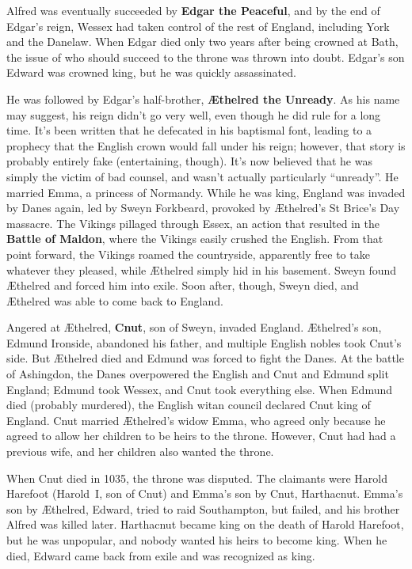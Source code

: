 Alfred was eventually succeeded by \textbf{Edgar the Peaceful}, and by the end of Edgar's reign,
Wessex had taken control of the rest of England, including York and the Danelaw.
When Edgar died only two years after being crowned at Bath,
the issue of who should succeed to the throne was thrown into doubt.
Edgar's son Edward was crowned king, but he was quickly assassinated.

He was followed by Edgar's half-brother, \textbf{\AE{}thelred the Unready}.
As his name may suggest, his reign didn't go very well, even though he did rule for a long time.
It's been written that he defecated in his baptismal font,
leading to a prophecy that the English crown would fall under his reign;
however, that story is probably entirely fake (entertaining, though).
It's now believed that he was simply the victim of bad counsel, and wasn't actually particularly ``unready''.
He married Emma, a princess of Normandy.
While he was king, England was invaded by Danes again, led by Sweyn Forkbeard,
provoked by \AE{}thelred's St Brice's Day massacre.
The Vikings pillaged through Essex, an action that resulted in the \textbf{Battle of Maldon},
where the Vikings easily crushed the English.
From that point forward, the Vikings roamed the countryside,
apparently free to take whatever they pleased,
while \AE{}thelred simply hid in his basement.
Sweyn found \AE{}thelred and forced him into exile.
Soon after, though, Sweyn died, and \AE{}thelred was able to come back to England.

Angered at \AE{}thelred, \textbf{Cnut}, son of Sweyn, invaded England.
\AE{}thelred's son, Edmund Ironside, abandoned his father,
and multiple English nobles took Cnut's side.
But \AE{}thelred died and Edmund was forced to fight the Danes.
At the battle of Ashingdon, the Danes overpowered the English and Cnut and Edmund split England;
Edmund took Wessex, and Cnut took everything else.
When Edmund died (probably murdered), the English witan council declared Cnut king of England.
Cnut married \AE{}thelred's widow Emma,
who agreed only because he agreed to allow her children to be heirs to the throne.
However, Cnut had had a previous wife, and her children also wanted the throne.

When Cnut died in 1035, the throne was disputed.
The claimants were Harold Harefoot (Harold~I, son of Cnut) and Emma's son by Cnut, Harthacnut.
Emma's son by \AE{}thelred, Edward, tried to raid Southampton, but failed,
and his brother Alfred was killed later.
Harthacnut became king on the death of Harold Harefoot, but he was unpopular,
and nobody wanted his heirs to become king.
When he died, Edward came back from exile and was recognized as king.

